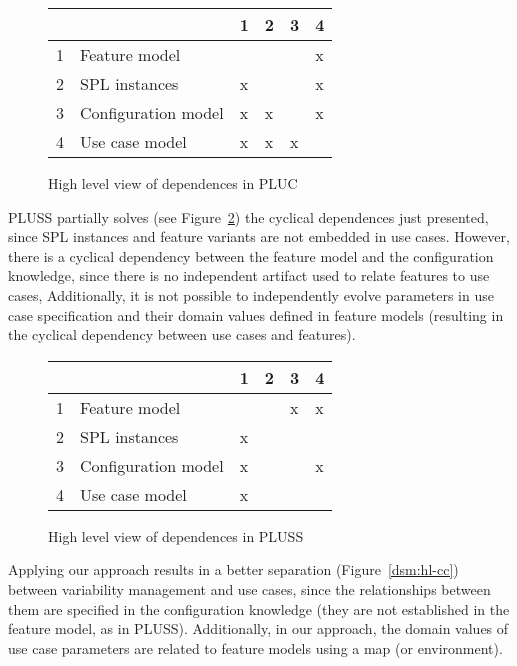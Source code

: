 \documentclass{acm_proc_article-sp}
\begin{document}
\begin{figure}[hb]
\centering
\begin{small}
\begin{tabular}{llllll} \hline
& & 1 & 2 & 3 & 4 \\ \hline
1 & Feature model 		& 	& 	& 	& x \\ 
2 & SPL instances 		& x 	& 	& 	& x \\
3 & Configuration model 	& x 	& x 	& 	& x \\
4 & Use case model 	& x 	& x 	& x 	& \\ \hline
\end{tabular}
\end{small}
\caption{High level view of dependences in PLUC}
\label{dsm:hl-pluc}
\end{figure}

PLUSS partially solves (see Figure~\ref{dsm:hl-pluss}) the cyclical dependences just presented, since SPL instances and feature variants are 
not embedded in use cases. However,  there is a cyclical dependency between the feature model and the configuration knowledge, since there is no independent artifact used to relate features to use cases, Additionally, it is not possible to 
independently evolve parameters in use case specification and their domain values defined in feature models 
(resulting in the cyclical dependency between use cases and features).

\begin{figure}[h]
\centering
\begin{small}
\begin{tabular}{llllll} \hline
& & 1 & 2 & 3 & 4 \\ \hline
1 & Feature model 		& 	& 	& x   & x \\ 
2 & SPL instances 		& x 	& 	& 	&   \\
3 & Configuration model 	& x 	&  	& 	& x \\
4 & Use case model 	& x 	&  	&  	& \\ \hline
\end{tabular}
\end{small}
\caption{High level view of dependences in PLUSS}
\label{dsm:hl-pluss}
\end{figure}

Applying our approach results in a better separation (Figure~\ref{dsm:hl-cc}) between
variability management and use cases, since the relationships between them are specified in the
configuration knowledge (they are not established in the feature model, as in PLUSS). 
Additionally, in our approach, the domain values of use
case parameters are related to feature models using a map (or environment).
\end{document}
